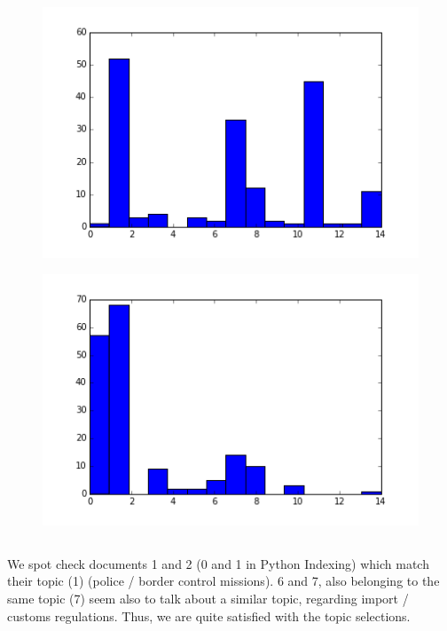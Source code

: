 \documentclass{article}
\begin{document}
\begin{figure}[H]
\centering
\includegraphics[width=120mm]{doctopicshist.png}
\end{figure}

\begin{figure}[H]
\centering
\includegraphics[width=120mm]{titletopicshist.png}
\end{figure}

\subsection{}

We spot check documents 1 and 2 (0 and 1 in Python Indexing) which match their topic (1) (police / border control missions). 6 and 7,  also belonging to the same topic (7) seem also to talk about a similar topic, regarding import / customs regulations. Thus, we are quite satisfied with the topic selections.
\end{document}
